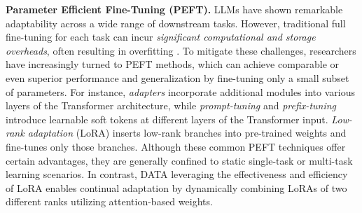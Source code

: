 \noindent \textbf{Parameter Efficient Fine-Tuning (PEFT).} LLMs have shown remarkable adaptability across a wide range of downstream tasks. However, traditional full fine-tuning for each task can incur \textit{significant computational and storage overheads}, often resulting in overfitting \cite{slora}. To mitigate these challenges, researchers have increasingly turned to PEFT methods, which can achieve comparable or even superior performance and generalization by fine-tuning only a small subset of parameters.
For instance, \textit{adapters} \cite{adapter} incorporate additional modules into various layers of the Transformer architecture, while \textit{prompt-tuning} \cite{prompt} and \textit{prefix-tuning} \cite{prefix} introduce learnable soft tokens at different layers of the Transformer input. \textit{Low-rank adaptation} (LoRA) \cite{hu2022lora} inserts low-rank branches into pre-trained weights and fine-tunes only those branches. Although these common PEFT techniques offer certain advantages, they are generally confined to static single-task or multi-task learning scenarios. In contrast, DATA leveraging the effectiveness and efficiency of LoRA enables continual adaptation by dynamically combining LoRAs of two different ranks \cite{vida} utilizing attention-based weights.

%